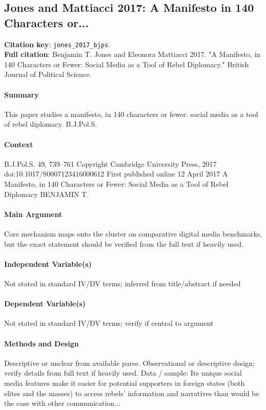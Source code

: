 \documentclass[12pt]{article}
\begin{document}
\subsection{Jones and Mattiacci 2017: A Manifesto in 140 Characters or...}
\textbf{Citation key}: \texttt{jones\_2017\_bjps}.\\
\textbf{Full citation}: Benjamin T. Jones and Eleonora Mattiacci 2017. "A Manifesto, in 140 Characters or Fewer: Social Media as a Tool of Rebel Diplomacy." British Journal of Political Science.

\paragraph{Summary} This paper studies a manifesto, in 140 characters or fewer: social media as a tool of rebel diplomacy. B.J.Pol.S.

\paragraph{Context} B.J.Pol.S. 49, 739--761 Copyright  Cambridge University Press, 2017 doi:10.1017/S0007123416000612 First published online 12 April 2017 A Manifesto, in 140 Characters or Fewer: Social Media as a Tool of Rebel Diplomacy BENJAMIN T.

\paragraph{Main Argument} Core mechanism maps onto the cluster on comparative digital media benchmarks, but the exact statement should be verified from the full text if heavily used.

\paragraph{Independent Variable(s)} Not stated in standard IV/DV terms; inferred from title/abstract if needed

\paragraph{Dependent Variable(s)} Not stated in standard IV/DV terms; verify if central to argument

\paragraph{Methods and Design} Descriptive or unclear from available parse. Observational or descriptive design; verify details from full text if heavily used. Data / sample: Its unique social media features make it easier for potential supporters in foreign states (both elites and the masses) to access rebels' information and narratives than would be the case with other communication...
\end{document}
